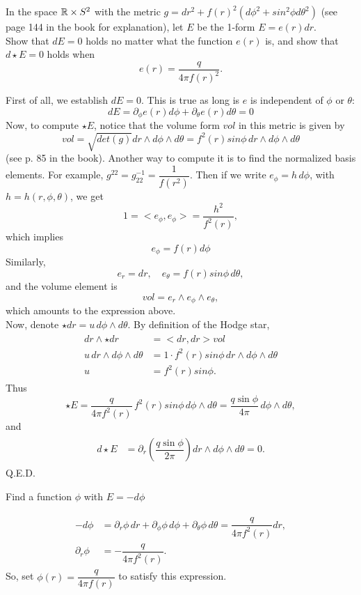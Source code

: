 \begin{p}%
	In the space $\mathbb{R}\times S^2$ with the metric $g = dr^2+f(r)^2(d\phi^2+sin^2\phi d\theta^2)$ (see page 144 in the book for explanation), let $E$ be the 1-form $E = e(r)dr$. \\
Show that $dE=0$ holds no matter what the function $e(r)$ is, and show that $d\star E=0$ holds when 
$$
e(r) = \dfrac{q}{4\pi f(r)^2}.
$$
\end{p}
First of all, we establish $dE=0$. This is true as long is $e$ is independent of $\phi$ or $\theta$: 
$$ dE =  \partial_{\phi}e(r)d\phi+\partial_{\theta}e(r)d\theta = 0$$
Now, to compute $\star E$, notice that the volume form $vol$ in this metric is given by 
$$ vol = \sqrt{det(g)}dr\wedge d\phi \wedge d\theta = f^2(r)sin\phi\, dr\wedge d\phi \wedge d\theta $$
(see p. 85 in the book). Another way to compute it is to find the normalized basis elements. For example, $g^{22} = g_{22}^{-1} = \dfrac{1}{f(r^2)}$. Then if we write $e_\phi = h\,d\phi$, with $h=h(r,\phi,\theta)$, we get 
$$ 1 = <e_\phi,e_\phi> = \dfrac{h^2}{f^2(r)},$$
which implies
$$e_{\phi} = f(r)d\phi$$
Similarly, 
$$ e_r = dr,\quad e_\theta = f(r)sin\phi \,d\theta,$$
and the volume element is 
$$ vol = e_r\wedge e_\phi \wedge e_\theta,$$ 
which amounts to the expression above.\\
Now, denote $\star dr = u\,d\phi\wedge d\theta$. By definition of the Hodge star,
\begin{eqnarray}
\begin{aligned}
dr \wedge \star dr & =<dr ,dr >vol\\	
u\, dr\wedge d\phi\wedge d\theta &= 1\cdot f^2(r)sin\phi\, dr\wedge d\phi \wedge d\theta\\
u &= f^2(r)sin\phi.
\end{aligned}
\end{eqnarray}
Thus 
$$\star E = \dfrac{q}{4\pi f^2(r)}\,f^2(r)sin\phi\,d\phi\wedge d\theta = \dfrac{q\sin\phi}{4\pi}\,d\phi\wedge d\theta,
$$ and
\begin{eqnarray}
\begin{aligned}
d\star E &= \partial_r\left( \dfrac{q\sin\phi}{2\pi}\right) dr \wedge d\phi\wedge d\theta = 0.
\end{aligned}
\end{eqnarray}
Q.E.D.



\begin{p}%
	Find a function $\phi$ with $E=-d\phi$
\end{p}
\begin{eqnarray}
\begin{aligned}
-d\phi &= \partial_r\phi\,dr+ \partial_\phi\phi\,d\phi+\partial_\theta\phi\,d\theta= \dfrac{q}{4\pi f^2(r)} dr,\\
\partial_r\phi &= -\dfrac{q}{4\pi f^2(r)}.
\end{aligned}
\end{eqnarray}
So, set $ \phi(r) = \dfrac{q}{4\pi f(r)}$ to satisfy this expression.


